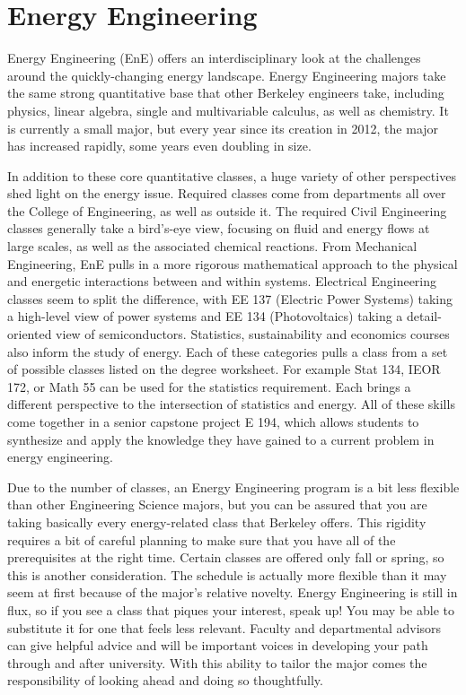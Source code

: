 \chapter*{Energy Engineering}

Energy Engineering (EnE) offers an interdisciplinary look at the challenges around the quickly-changing energy landscape. Energy Engineering majors take the same strong quantitative base that other Berkeley engineers take, including physics, linear algebra, single and multivariable calculus, as well as chemistry. It is currently a small major, but every year since its creation in 2012, the major has increased rapidly, some years even doubling in size.

In addition to these core quantitative classes, a huge variety of other perspectives shed light on the energy issue. Required classes come from departments all over the College of Engineering, as well as outside it. The required Civil Engineering classes generally take a bird’s-eye view, focusing on fluid and energy flows at large scales, as well as the associated chemical reactions. From Mechanical Engineering, EnE pulls in a more rigorous mathematical approach to the physical and energetic interactions between and within systems. Electrical Engineering classes seem to split the difference, with EE 137 (Electric Power Systems) taking a high-level view of power systems and EE 134 (Photovoltaics) taking a detail-oriented view of semiconductors. Statistics, sustainability and economics courses also inform the study of energy. Each of these categories pulls a class from a set of possible classes listed on the degree worksheet. For example Stat 134, IEOR 172, or Math 55 can be used for the statistics requirement. Each brings a different perspective to the intersection of statistics and energy. All of these skills come together in a senior capstone project E 194, which allows students to synthesize and apply the knowledge they have gained to a current problem in energy engineering.
 
Due to the number of classes, an Energy Engineering program is a bit less flexible than other Engineering Science majors, but you can be assured that you are taking basically every energy-related class that Berkeley offers. This rigidity requires a bit of careful planning to make sure that you have all of the prerequisites at the right time. Certain classes are offered only fall or spring, so this is another consideration. The schedule is actually more flexible than it may seem at first because of the major’s relative novelty. Energy Engineering is still in flux, so if 
you see a class that piques your interest, speak up! You may be able to substitute it for one that feels less relevant. Faculty and departmental advisors can give helpful advice and will be important voices in developing your path through and after university. With this ability to tailor the major comes the responsibility of looking ahead and doing so thoughtfully.
 
